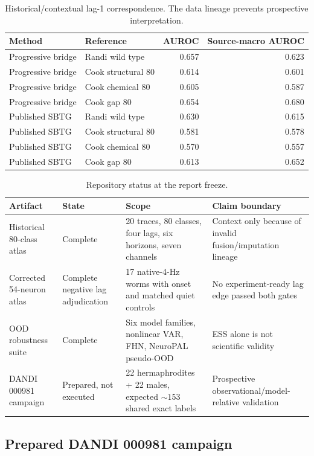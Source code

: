 \documentclass[10pt]{article}
\begin{document}
\begin{table}[H]
\centering\small
\begin{tabular}{llrr}
\toprule Method & Reference & AUROC & Source-macro AUROC \\
\midrule
Progressive bridge & Randi wild type & 0.657 & 0.623 \\
Progressive bridge & Cook structural 80 & 0.614 & 0.601 \\
Progressive bridge & Cook chemical 80 & 0.605 & 0.587 \\
Progressive bridge & Cook gap 80 & 0.654 & 0.680 \\
Published SBTG & Randi wild type & 0.630 & 0.615 \\
Published SBTG & Cook structural 80 & 0.581 & 0.578 \\
Published SBTG & Cook chemical 80 & 0.570 & 0.557 \\
Published SBTG & Cook gap 80 & 0.613 & 0.652 \\
\bottomrule
\end{tabular}
\caption{Historical/contextual lag-1 correspondence. The data lineage prevents prospective interpretation.}
\end{table}

\begin{table}[H]
\centering\small
\begin{tabularx}{\linewidth}{L{3.0cm}L{2.5cm}Y Y}
\toprule Artifact & State & Scope & Claim boundary \\
\midrule
Historical 80-class atlas & Complete & 20 traces, 80 classes, four lags, six horizons, seven channels & Context only because of invalid fusion/imputation lineage \\
Corrected 54-neuron atlas & Complete negative lag adjudication & 17 native-4-Hz worms with onset and matched quiet controls & No experiment-ready lag edge passed both gates \\
OOD robustness suite & Complete & Six model families, nonlinear VAR, FHN, NeuroPAL pseudo-OOD & ESS alone is not scientific validity \\
DANDI 000981 campaign & Prepared, not executed & 22 hermaphrodites + 22 males, expected $\sim153$ shared exact labels & Prospective observational/model-relative validation \\
\bottomrule
\end{tabularx}
\caption{Repository status at the report freeze.}
\end{table}

\subsection{Prepared DANDI 000981 campaign}
\end{document}
